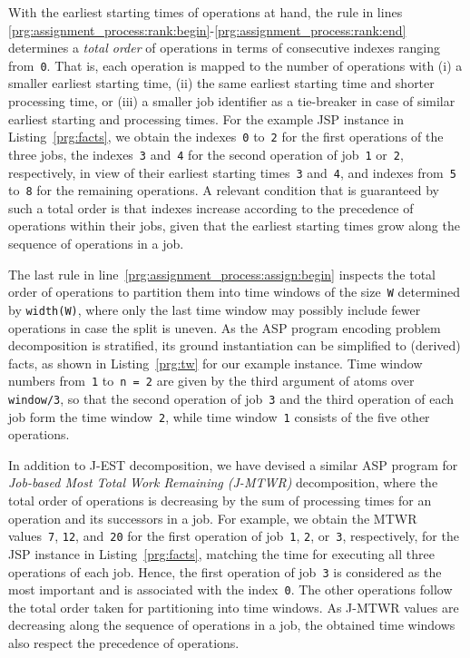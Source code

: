 \documentclass{tlp} %
\begin{document}
With the earliest starting times of operations at hand,
the rule in lines \ref{prg:assignment_process:rank:begin}-\ref{prg:assignment_process:rank:end}
determines a \emph{total order} of operations in terms of consecutive indexes ranging
from~\lstinline{0}.
That is, each operation is mapped to the number of operations with
(i) a smaller earliest starting time,
(ii) the same earliest starting time and shorter processing time, or
(iii) a smaller job identifier as a tie-breaker in case of similar
earliest starting and processing times.
For the example JSP instance in Listing~\ref{prg:facts},
we obtain the indexes~\lstinline{0} to~\lstinline{2} for the first operations of the
three jobs,
the indexes~\lstinline{3} and~\lstinline{4} for the second operation of
job~\lstinline{1} or~\lstinline{2}, respectively,
in view of their earliest starting times~\lstinline{3} and~\lstinline{4},
and indexes from~\lstinline{5} to~\lstinline{8} for the remaining operations.
A relevant condition that is guaranteed by such a total order is that
indexes increase according to the precedence of operations within their jobs,
given that the earliest starting times grow along the sequence of operations in a job.

The last rule in line~\ref{prg:assignment_process:assign:begin} inspects the total
order of operations to partition them into time windows of the size~\lstinline{W}
determined by \lstinline{width(W)},
where only the last time window may possibly include fewer operations in case the
split is uneven.
As the ASP program encoding problem decomposition is stratified, its ground
instantiation can be simplified to (derived) facts, as shown in Listing~\ref{prg:tw}
for our example instance.
Time window numbers from~\lstinline{1} to~\lstinline{n = 2} are given by
the third argument of atoms over \lstinline{window/3}, so that the second operation
of job~\lstinline{3} and the third operation of each job form the time window~\lstinline{2},
while time window~\lstinline{1} consists of the five other operations.
%


In addition to J-EST decomposition, we have devised a similar ASP program for
\emph{Job-based Most Total Work Remaining (J-MTWR)} decomposition,
where the total order of operations is decreasing by the sum of processing
times for an operation and its successors in a job.
For example, we obtain the MTWR values~\lstinline{7}, \lstinline{12}, and~\lstinline{20}
for the first operation of job~\lstinline{1}, \lstinline{2}, or~\lstinline{3},
respectively, for the JSP instance in Listing~\ref{prg:facts},
matching the time for executing all three operations of each job.
Hence, the first operation of job~\lstinline{3} is considered as the most
important and is associated with the index~\lstinline{0}. The other
operations follow the total order taken for partitioning into time windows.
As J-MTWR values are decreasing along the sequence of operations in a job, the obtained time windows also respect the precedence of operations.
\end{document}
